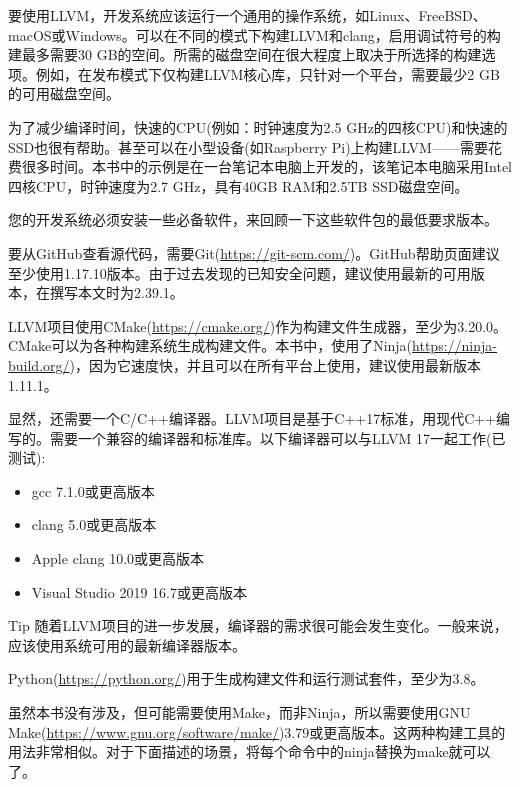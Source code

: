
要使用LLVM，开发系统应该运行一个通用的操作系统，如Linux、FreeBSD、macOS或Windows。可以在不同的模式下构建LLVM和clang，启用调试符号的构建最多需要30 GB的空间。所需的磁盘空间在很大程度上取决于所选择的构建选项。例如，在发布模式下仅构建LLVM核心库，只针对一个平台，需要最少2 GB的可用磁盘空间。

为了减少编译时间，快速的CPU(例如：时钟速度为2.5 GHz的四核CPU)和快速的SSD也很有帮助。甚至可以在小型设备(如Raspberry Pi)上构建LLVM——需要花费很多时间。本书中的示例是在一台笔记本电脑上开发的，该笔记本电脑采用Intel四核CPU，时钟速度为2.7 GHz，具有40GB RAM和2.5TB SSD磁盘空间。

您的开发系统必须安装一些必备软件，来回顾一下这些软件包的最低要求版本。

要从GitHub查看源代码，需要Git(\url{https://git-scm.com/})。GitHub帮助页面建议至少使用1.17.10版本。由于过去发现的已知安全问题，建议使用最新的可用版本，在撰写本文时为2.39.1。

LLVM项目使用CMake(\url{https://cmake.org/})作为构建文件生成器，至少为3.20.0。CMake可以为各种构建系统生成构建文件。本书中，使用了Ninja(\url{https://ninja-build.org/})，因为它速度快，并且可以在所有平台上使用，建议使用最新版本1.11.1。

显然，还需要一个C/C++编译器。LLVM项目是基于C++17标准，用现代C++编写的。需要一个兼容的编译器和标准库。以下编译器可以与LLVM 17一起工作(已测试):

\begin{itemize}
\item
gcc 7.1.0或更高版本

\item
clang 5.0或更高版本

\item
Apple clang 10.0或更高版本

\item
Visual Studio 2019 16.7或更高版本
\end{itemize}

\begin{myTip}{Tip}
随着LLVM项目的进一步发展，编译器的需求很可能会发生变化。一般来说，应该使用系统可用的最新编译器版本。
\end{myTip}

Python(\url{https://python.org/})用于生成构建文件和运行测试套件，至少为3.8。

虽然本书没有涉及，但可能需要使用Make，而非Ninja，所以需要使用GNU Make(\url{https://www.gnu.org/software/make/})3.79或更高版本。这两种构建工具的用法非常相似。对于下面描述的场景，将每个命令中的ninja替换为make就可以了。

